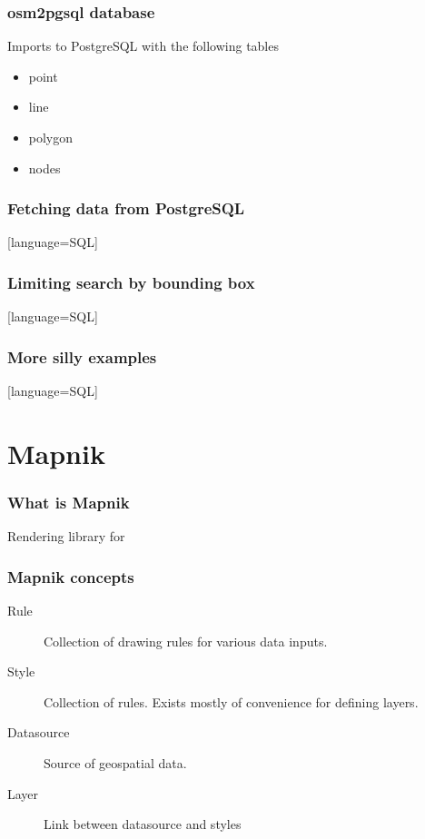 \documentclass{beamer}
\begin{document}
\begin{frame}
  \frametitle{osm2pgsql database}
  Imports to PostgreSQL with the following tables
  \begin{itemize}
  \item point
  \item line
  \item polygon
  \item nodes
  \end{itemize}
\end{frame}

\begin{frame}
  \frametitle{Fetching data from PostgreSQL}
  [language=SQL]
\end{frame}

\begin{frame}
  \frametitle{Limiting search by bounding box}
  [language=SQL]
\end{frame}

\begin{frame}
  \frametitle{More silly examples}
  [language=SQL]
\end{frame}

\section{Mapnik}

\begin{frame}
  \frametitle{What is Mapnik}
  Rendering library for
\end{frame}

\begin{frame}
  \frametitle{Mapnik concepts}
  \begin{description}
  \item[Rule] Collection of drawing rules for various data inputs.
  \item[Style] Collection of rules. Exists mostly of convenience
    for defining layers.
  \item[Datasource] Source of geospatial data.
  \item[Layer] Link between datasource and styles
  \end{description}
\end{frame}
\end{document}
